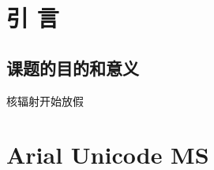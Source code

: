 \documentclass[UTF8, a4paper]{ctexart}
\newcommand{\upcite}[1]{\textsuperscript{\textsuperscript{
			\citeleft}\cite{#1}\textsuperscript{\citeright}}}					%
\begin{document}
	\fancyhead[C]{\leftmark}										%
	\setcounter{page}{1}
	\renewcommand{\sectionmark}[1]{\markboth{第\thesection 章\quad 	%
			\ #1}{}}
	\section{引\texorpdfstring{\quad}{} 言}							%
	\subsection{课题的目的和意义}
	核辐射开始放假\upcite{1,2,3}
	\newpage
	\section{Arial Unicode MS}
	
\end{document}
